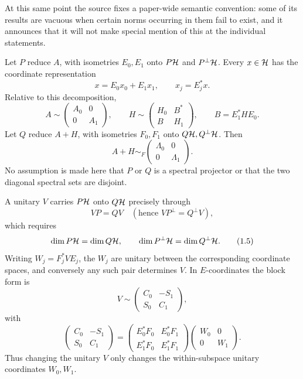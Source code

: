 At this same point the source fixes a paper-wide semantic convention: some of its results are vacuous when certain norms occurring in them fail to exist, and it announces that it will not make special mention of this at the individual statements.

Let $P$ reduce $A$, with isometries $E_0,E_1$ onto $P\mathcal{H}$ and $P^\perp\mathcal{H}$.  Every $x\in\mathcal{H}$ has the coordinate representation
\begin{equation}
 x=E_0x_0+E_1x_1,
 \qquad x_j=E_j^*x.
 \tag{1.1}
\end{equation}
Relative to this decomposition,
\begin{equation}
 A\sim\begin{pmatrix}A_0&0\\0&A_1\end{pmatrix},
 \qquad
 H\sim\begin{pmatrix}H_0&B^*\\B&H_1\end{pmatrix},
 \qquad B=E_1^*HE_0.
 \tag{1.2}
\end{equation}
Let $Q$ reduce $A+H$, with isometries $F_0,F_1$ onto $Q\mathcal{H},Q^\perp\mathcal{H}$.  Then
\begin{equation}
 A+H\sim_F\begin{pmatrix}\Lambda_0&0\\0&\Lambda_1\end{pmatrix}.
 \tag{1.3}
\end{equation}
No assumption is made here that $P$ or $Q$ is a spectral projector or that the two diagonal spectral sets are disjoint.

A unitary $V$ carries $P\mathcal{H}$ onto $Q\mathcal{H}$ precisely through
\begin{equation}
 VP=QV \quad(\text{hence }VP^\perp=Q^\perp V),
 \tag{1.4}
\end{equation}
which requires
\begin{equation}
 \dim P\mathcal{H}=\dim Q\mathcal{H},
 \qquad \dim P^\perp\mathcal{H}=\dim Q^\perp\mathcal{H}.
 \tag{1.5}
\end{equation}
Writing $W_j=F_j^*VE_j$, the $W_j$ are unitary between the corresponding coordinate spaces, and conversely any such pair determines $V$.  In $E$-coordinates the block form is
\begin{equation}
 V\sim\begin{pmatrix}C_0&-S_1\\S_0&C_1\end{pmatrix},
 \tag{1.6}
\end{equation}
with
\begin{equation}
 \begin{pmatrix}C_0&-S_1\\S_0&C_1\end{pmatrix}
 =
 \begin{pmatrix}E_0^*F_0&E_0^*F_1\\E_1^*F_0&E_1^*F_1\end{pmatrix}
 \begin{pmatrix}W_0&0\\0&W_1\end{pmatrix}.
 \tag{1.7}
\end{equation}
Thus changing the unitary $V$ only changes the within-subspace unitary coordinates $W_0,W_1$.

